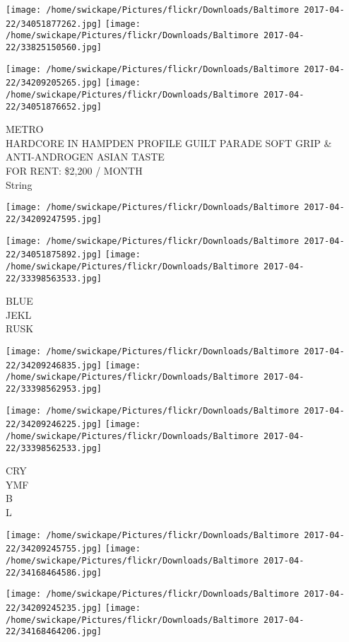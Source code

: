 \documentclass[10pt,letterpaper]{article}
\begin{document}
\texttt{[image: /home/swickape/Pictures/flickr/Downloads/Baltimore 2017-04-22/34051877262.jpg]}
\texttt{[image: /home/swickape/Pictures/flickr/Downloads/Baltimore 2017-04-22/33825150560.jpg]}

\texttt{[image: /home/swickape/Pictures/flickr/Downloads/Baltimore 2017-04-22/34209205265.jpg]}
\texttt{[image: /home/swickape/Pictures/flickr/Downloads/Baltimore 2017-04-22/34051876652.jpg]}

METRO\\
HARDCORE IN HAMPDEN PROFILE GUILT PARADE SOFT GRIP \& ANTI{-}ANDROGEN ASIAN TASTE\\
FOR RENT: \$2,200 / MONTH\\
String
\pagebreak

\texttt{[image: /home/swickape/Pictures/flickr/Downloads/Baltimore 2017-04-22/34209247595.jpg]}

\vspace{0.25in}
\texttt{[image: /home/swickape/Pictures/flickr/Downloads/Baltimore 2017-04-22/34051875892.jpg]}
\texttt{[image: /home/swickape/Pictures/flickr/Downloads/Baltimore 2017-04-22/33398563533.jpg]}

BLUE\\
JEKL\\
RUSK
\pagebreak

\texttt{[image: /home/swickape/Pictures/flickr/Downloads/Baltimore 2017-04-22/34209246835.jpg]}
\texttt{[image: /home/swickape/Pictures/flickr/Downloads/Baltimore 2017-04-22/33398562953.jpg]}

\texttt{[image: /home/swickape/Pictures/flickr/Downloads/Baltimore 2017-04-22/34209246225.jpg]}
\texttt{[image: /home/swickape/Pictures/flickr/Downloads/Baltimore 2017-04-22/33398562533.jpg]}

CRY\\
YMF\\
B\\
L
\pagebreak

\texttt{[image: /home/swickape/Pictures/flickr/Downloads/Baltimore 2017-04-22/34209245755.jpg]}
\texttt{[image: /home/swickape/Pictures/flickr/Downloads/Baltimore 2017-04-22/34168464586.jpg]}

\texttt{[image: /home/swickape/Pictures/flickr/Downloads/Baltimore 2017-04-22/34209245235.jpg]}
\texttt{[image: /home/swickape/Pictures/flickr/Downloads/Baltimore 2017-04-22/34168464206.jpg]}
\end{document}
